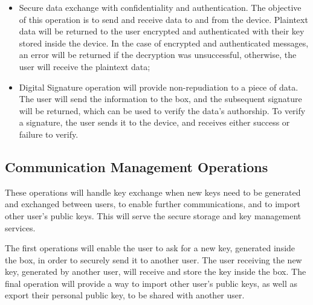 \begin{itemize}
    \item Secure data exchange with confidentiality and authentication. The objective of this operation is to send and receive data to and from the device. Plaintext data will be returned to the user encrypted and authenticated with their key stored inside the device. In the case of encrypted and authenticated messages, an error will be returned if the decryption was unsuccessful, otherwise, the user will receive the plaintext data;
    \item Digital Signature operation will provide non-repudiation to a piece of data. The user will send the information to the box, and the subsequent signature will be returned, which can be used to verify the data's authorship. To verify a signature, the user sends it to the device, and receives either success or failure to verify.
\end{itemize}

\subsection{Communication Management Operations}\label{chap:arch:ops:key}

These operations will handle key exchange when new keys need to be generated and exchanged between users, to enable further communications, and to import other user's public keys. This will serve the secure storage and key management services.

The first operations will enable the user to ask for a new key, generated inside the box, in order to securely send it to another user. The user receiving the new key, generated by another user, will receive and store the key inside the box.
The final operation will provide a way to import other user's public keys, as well as export their personal public key, to be shared with another user.



